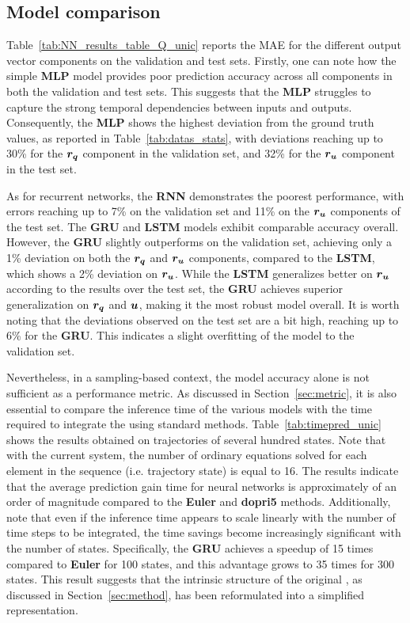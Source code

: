 \subsection{Model comparison}\label{sec:nn_comparaison_unic}

Table~\ref{tab:NN_results_table_Q_unic} reports the MAE for the different output vector components on the validation and test sets. 
Firstly, one can note how the simple \textbf{MLP} model provides poor prediction accuracy across all components in both the validation and test sets.
This suggests that the \textbf{MLP} struggles to capture the strong temporal dependencies between inputs and outputs.
Consequently, the \textbf{MLP} shows the highest deviation from the ground truth values, as reported in Table~\ref{tab:datas_stats}, with deviations reaching up to 30\% for the $\boldsymbol{r_q}$ component in the validation set, and 32\% for the $\boldsymbol{r_u}$ component in the test set.

As for recurrent networks, the \textbf{RNN} demonstrates the poorest performance, with errors reaching up to 7\% on the validation set and 11\% on the $\boldsymbol{r_u}$ components of the test set.
The \textbf{GRU} and \textbf{LSTM} models exhibit comparable accuracy overall. 
However, the \textbf{GRU} slightly outperforms on the validation set, achieving only a 1\% deviation on both the $\boldsymbol{r_q}$ and $\boldsymbol{r_u}$ components, compared to the \textbf{LSTM}, which shows a 2\% deviation on $\boldsymbol{r_u}$.
While the \textbf{LSTM} generalizes better on $\boldsymbol{r_u}$ according to the results over the test set, the \textbf{GRU} achieves superior generalization on $\boldsymbol{r_q}$ and $\boldsymbol{u}$, making it the most robust model overall.
It is worth noting that the deviations observed on the test set are a bit high, reaching up to 6\% for the \textbf{GRU}. 
This indicates a slight overfitting of the model to the validation set.

Nevertheless, in a sampling-based context, the model accuracy alone is not sufficient as a performance metric.
As discussed in Section~\ref{sec:metric}, it is also essential to compare the inference time of the various models with the time required to integrate the  using standard methods.
Table~\ref{tab:timepred_unic} shows the results obtained on trajectories of several hundred states. 
Note that with the current system, the number of ordinary equations solved for each element in the sequence (i.e. trajectory state) is equal to 16.
The results indicate that the average prediction gain time for neural networks is approximately of an order of magnitude compared to the \textbf{Euler} and \textbf{dopri5} methods. 
Additionally, note that even if the inference time appears to scale linearly with the number of time steps to be integrated, the time savings become increasingly significant with the number of states. 
Specifically, the \textbf{GRU} achieves a speedup of 15 times compared to \textbf{Euler} for 100 states, and this advantage grows to 35 times for 300 states.
This result suggests that the intrinsic structure of the original , as discussed in Section~\ref{sec:method}, has been reformulated into a simplified representation.

